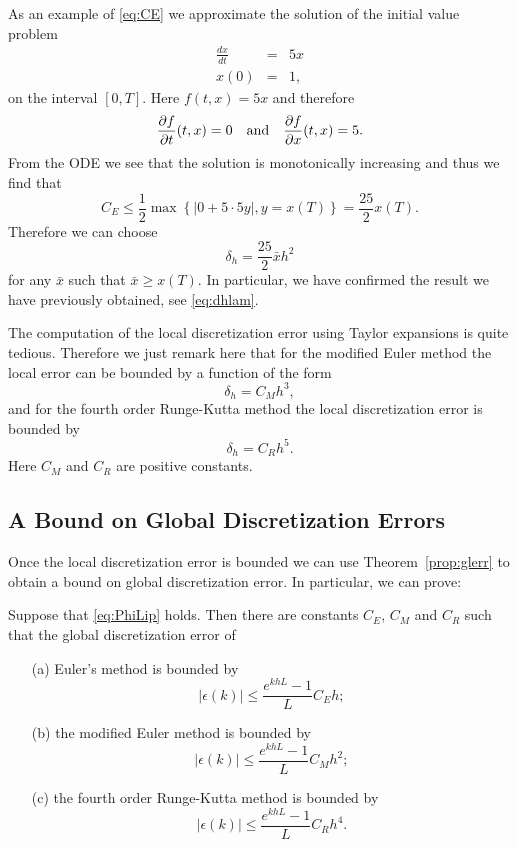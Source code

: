 \documentclass{ximera}
\begin{document}
As an example of \eqref{eq:CE} we approximate the solution of the initial 
value problem
\begin{eqnarray*}
\frac{dx}{dt} & = & 5 x\\
 x(0) & = & 1,
\end{eqnarray*}
on the interval $[0,T]$.  Here $f(t,x)=5 x$ and therefore
\[
\frac{\partial f}{\partial t}(t,x)=0\quad\mbox{and}\quad
\frac{\partial f}{\partial x}(t,x)=5.
\]
From the ODE we see that the solution is monotonically increasing
and thus we find that
\[
C_E\le \frac{1}{2}\max\left\{ \left\vert 0+5\cdot 5y\right\vert,
y=x(T) \right\} = \frac{25}{2}x(T).
\]
Therefore we can choose
\[
\delta_h = \frac{25}{2}\bar x h^2
\]
for any $\bar x$ such that $\bar x \ge x(T)$.  In particular,
we have confirmed the result we have previously obtained, 
see \eqref{eq:dhlam}.

The computation of the local discretization error using Taylor expansions 
is quite tedious.  Therefore we just remark here that
for the modified Euler 
method 
the local error can be bounded by a function
of the form
\[
\delta_h = C_Mh^3,
\]
and for the fourth order Runge-Kutta 
method 
the local discretization error is bounded by
\[
\delta_h = C_R h^5.
\]
Here $C_M$ and $C_R$ are positive constants.  

\subsection*{A Bound on Global Discretization Errors}

Once the local discretization error is bounded we can use
Theorem~\ref{prop:glerr} to obtain a bound on global discretization 
error.  In particular, we can prove:
\begin{proposition} \label{prop:errEMR}
Suppose that \eqref{eq:PhiLip} holds.  Then there are constants $C_E$,
$C_M$ and $C_R$ such that the global discretization error of
\begin{itemize}
\item[(a)] 
Euler's method is bounded by
\[
|\epsilon(k)| \le \frac{e^{khL}-1}{L}C_E h;
\]
\item[(b)] 
the modified Euler method is bounded by
\[
|\epsilon(k)| \le \frac{e^{khL}-1}{L}C_M h^2;
\]
\item[(c)] 
the fourth order Runge-Kutta method is bounded by
\[
|\epsilon(k)| \le \frac{e^{khL}-1}{L}C_R h^4.
\]
\end{itemize}
\end{proposition}
\end{document}
